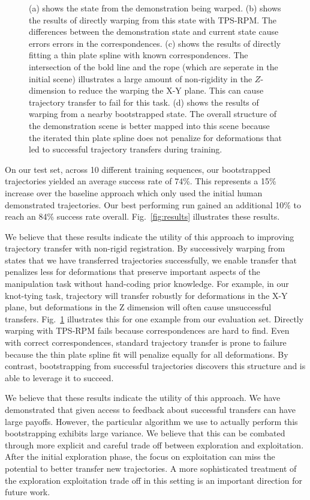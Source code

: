 \begin{figure}
{  (a) shows the state from the demonstration being warped. (b) shows the results of directly warping from this state with TPS-RPM. The differences between the demonstration state and current state cause errors errors in the correspondences. (c) shows the results of directly fitting a thin plate spline with known correspondences. The intersection of the bold line and the rope (which are seperate in the initial scene) illustrates a large amount of non-rigidity in the $Z$-dimension to reduce the warping the X-Y plane. This can cause trajectory transfer to fail for this task. (d) shows the results of warping from a nearby bootstrapped state. The overall structure of the demonstration scene is better mapped into this scene because the iterated thin plate spline does not penalize for deformations that led to successful trajectory transfers during training.}
  \label{fig:warps}
\end{figure}



On our test set, across 10 different training sequences, our bootstrapped trajectories yielded an average success rate of 74\%. This represents a 15\% increase over the baseline 
approach which only used the initial human demonstrated trajectories. Our best performing run gained an additional 10\% to reach an 84\% success rate overall. Fig.~\ref{fig:results} 
illustrates these results.

We believe that these results indicate the utility of this approach to improving trajectory transfer with non-rigid registration. By successively warping from states that we have transferred trajectories successfully, we enable transfer that penalizes less for deformations that preserve important aspects of the manipulation task without hand-coding prior knowledge. For example, in our knot-tying task, trajectory 
will transfer robustly for deformations in the X-Y plane, but deformations in the Z dimension will often cause unsuccessful transfers. Fig.~\ref{fig:warps} illustrates this for one example from our evaluation set. Directly warping with TPS-RPM fails because correspondences are hard to find. Even with correct correspondences, standard trajectory transfer is prone to failure because the thin plate spline fit will penalize equally for all deformations. By contrast, bootstrapping from successful trajectories discovers this structure and is able to leverage it to succeed. 

We believe that these results indicate the utility of this approach. We have demonstrated that
given access to feedback about successful transfers can have large payoffs. However,
the particular algorithm we use to actually perform this bootstrapping exhibits large variance.
We believe that this can be combated through more explicit and careful trade off between
exploration and exploitation. After the initial exploration phase, the focus on exploitation
can miss the potential to better transfer new trajectories. A more sophisticated treatment
of the exploration exploitation trade off in this setting is an important direction for future work.


